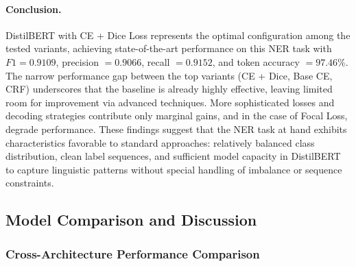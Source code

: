 \paragraph{Conclusion.}
DistilBERT with CE + Dice Loss represents the optimal configuration among the tested variants, achieving state-of-the-art performance on this NER task with $F1 = 0.9109$, precision $= 0.9066$, recall $= 0.9152$, and token accuracy $= 97.46\%$.
The narrow performance gap between the top variants (CE + Dice, Base CE, CRF) underscores that the baseline is already highly effective, leaving limited room for improvement via advanced techniques.
More sophisticated losses and decoding strategies contribute only marginal gains, and in the case of Focal Loss, degrade performance.
These findings suggest that the NER task at hand exhibits characteristics favorable to standard approaches: relatively balanced class distribution, clean label sequences, and sufficient model capacity in DistilBERT to capture linguistic patterns without special handling of imbalance or sequence constraints.


\subsection{Model Comparison and Discussion}

\subsubsection{Cross-Architecture Performance Comparison}

